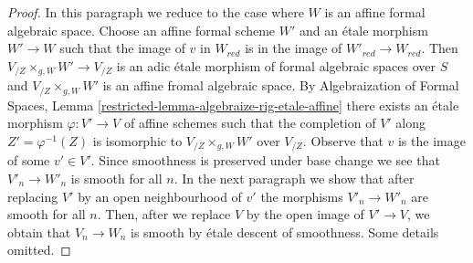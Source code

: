 \begin{proof}
\medskip\noindent
In this paragraph we reduce to the case where $W$ is an affine formal
algebraic space. Choose an affine formal scheme $W'$ and an \'etale morphism
$W' \to W$ such that the image of $v$ in $W_{red}$ is in the
image of $W'_{red} \to W_{red}$. Then $V_{/Z} \times_{g, W} W' \to V_{/Z}$
is an adic \'etale morphism of formal algebraic spaces over $S$
and $V_{/Z} \times_{g, W} W'$ is an affine fromal algebraic space.
By Algebraization of Formal Spaces,
Lemma \ref{restricted-lemma-algebraize-rig-etale-affine}
there exists an \'etale morphism $\varphi : V' \to V$ of affine schemes
such that the completion of $V'$ along $Z' = \varphi^{-1}(Z)$
is isomorphic to $V_{/Z} \times_{g, W} W'$ over $V_{/Z}$.
Observe that $v$ is the image of some $v' \in V'$.
Since smoothness is preserved under base change we see that
$V'_n \to W'_n$ is smooth for all $n$. In the next paragraph
we show that after replacing $V'$ by an open neighbourhood of $v'$
the morphisms $V'_n \to W'_n$ are smooth for all $n$.
Then, after we replace $V$ by the open image of $V' \to V$,
we obtain that $V_n \to W_n$ is smooth by \'etale descent of smoothness.
Some details omitted.


\end{proof}
